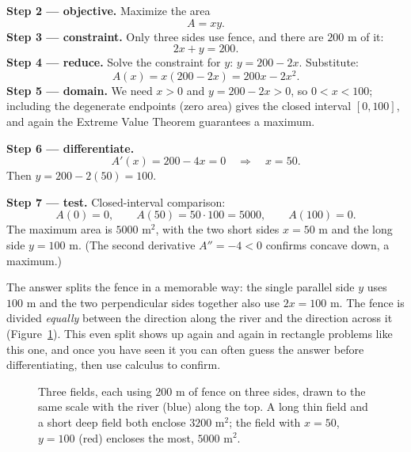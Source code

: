\textbf{Step 2 --- objective.} Maximize the area
\[
A = xy.
\]
\textbf{Step 3 --- constraint.} Only three sides use fence, and there are $200$ m of
it:
\[
2x + y = 200.
\]
\textbf{Step 4 --- reduce.} Solve the constraint for $y$: $y = 200 - 2x$. Substitute:
\[
A(x) = x(200-2x) = 200x - 2x^2.
\]
\textbf{Step 5 --- domain.} We need $x>0$ and $y = 200-2x>0$, so $0 < x < 100$;
including the degenerate endpoints (zero area) gives the closed interval $[0,100]$,
and again the Extreme Value Theorem guarantees a maximum.

\textbf{Step 6 --- differentiate.}
\[
A'(x) = 200 - 4x = 0 \quad\Longrightarrow\quad x = 50.
\]
Then $y = 200 - 2(50) = 100$.

\textbf{Step 7 --- test.} Closed-interval comparison:
\[
A(0)=0, \qquad A(50) = 50\cdot 100 = 5000, \qquad A(100)=0.
\]
The maximum area is $\boxed{5000\text{ m}^2}$, with the two short sides $x=50$ m and
the long side $y=100$ m. (The second derivative $A''=-4<0$ confirms concave down, a
maximum.)

\begin{intuitionbox}
The answer splits the fence in a memorable way: the single parallel side $y$
uses $100$ m and the two perpendicular sides together also use $2x=100$ m. The fence
is divided \emph{equally} between the direction along the river and the direction
across it (Figure~\ref{ch17:fig-fence-shapes}). This even split shows up again and
again in rectangle problems like this one, and once you have seen it you can often
guess the answer before differentiating, then use calculus to confirm.
\end{intuitionbox}

\begin{figure}[htbp]
\centering
{}
\caption{Three fields, each using $200$ m of fence on three sides, drawn to the same
scale with the river (blue) along the top. A long thin field and a short deep field
both enclose $3200$ m$^2$; the field with $x=50$, $y=100$ (red) encloses the most,
$5000$ m$^2$.}
\label{ch17:fig-fence-shapes}
\end{figure}

